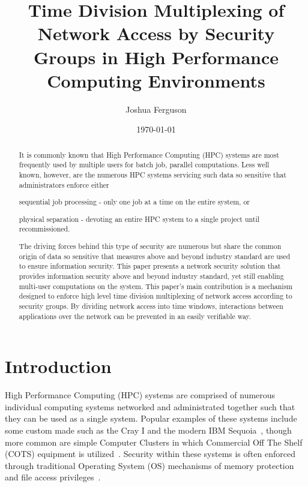 \documentclass{llncs}
\begin{document}
\title{Time Division Multiplexing of Network Access by Security Groups in High Performance Computing Environments}
\author{Joshua Ferguson}
\date{\today}
\maketitle
\begin{abstract}
It is commonly known that High Performance Computing (HPC) systems are most frequently used by multiple users for batch job, parallel computations. Less well known, however, are the numerous HPC systems servicing such data so sensitive that administrators enforce either \begin{inparaenum} 
\item sequential job processing - only one job at a time on the entire system, or
\item physical separation - devoting an entire HPC system to a single project until recommissioned.
\end{inparaenum}
The driving forces behind this type of security are numerous but share the common origin of data so sensitive that measures above and beyond industry standard are used to ensure information security. This paper presents a network security solution that provides information security above and beyond industry standard, yet still enabling multi-user computations on the system. This paper's main contribution is a mechanism designed to enforce high level time division multiplexing of network access according to security groups. By dividing network access into time windows, interactions between applications over the network can be prevented in an easily verifiable way. 
\end{abstract}
\section{Introduction}
High Performance Computing (HPC) systems are comprised of numerous individual computing systems networked and administrated together such that they can be used as a single system. Popular examples of these systems include some custom made such as the Cray I and the modern IBM Sequoia~\cite{leavitt2012big}, though more common are simple Computer Clusters in which Commercial Off The Shelf (COTS) equipment is utilized~\cite{buyya1999high}. Security within these systems is often enforced through traditional Operating System (OS) mechanisms of memory protection and file access privileges~\cite{buyya1999high}. 
\end{document}
